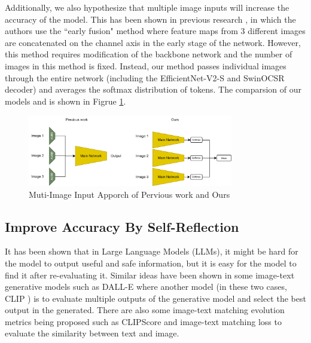 \documentclass[12pt]{article}
\begin{document}
Additionally, we also hypothesize that multiple image inputs will increase the accuracy of the model. This has been shown in previous research \autocite{sun_multi-input_2017}, in which the authors use the ``early fusion" method where feature maps from 3 different images are concatenated on the channel axis in the early stage of the network. However, this method requires modification of the backbone network and the number of images in this method is fixed. Instead, our method passes individual images through the entire network (including the EfficientNet-V2-S and SwinOCSR decoder) and averages the softmax distribution of tokens. The comparsion of our models and \autocite{sun_multi-input_2017} is shown in Figrue \ref{mi}.

\begin{figure}
    \centering
    \includegraphics[width=0.8\textwidth]{mi.drawio.png}
    \caption{Muti-Image Input Apporch of Pervious work \autocite{sun_multi-input_2017} and Ours}
    \label{mi}
\end{figure}


\subsection{Improve Accuracy By Self-Reflection}
It has been shown that in Large Language Models (LLMs), it might be hard for the model to output useful and safe information, but it is easy for the model to find it after re-evaluating it. \autocite{bai_constitutional_2022} Similar ideas have been shown in some image-text generative models such as DALL-E \autocite{ramesh_zero-shot_2021}
where another model (in these two cases, CLIP \autocite{radford_learning_2021}) is to evaluate multiple outputs of the generative model and select the best output in the generated. There are also some image-text matching evolution metrics being proposed such as CLIPScore \autocite{hessel_clipscore:_2022} and image-text matching loss \autocite{xu_attngan:_2017} to evaluate the similarity between text and image. 
\end{document}

